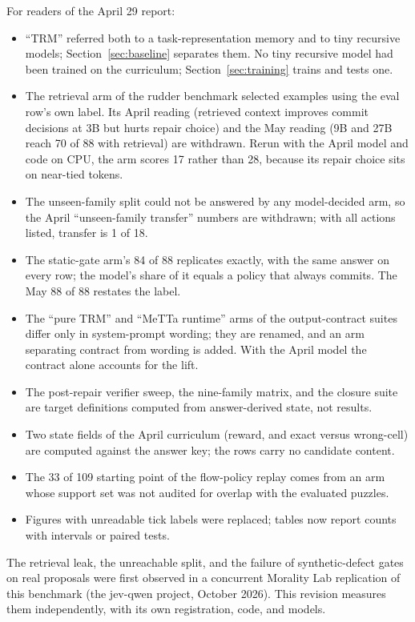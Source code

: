 \documentclass[11pt]{article}
\begin{document}
For readers of the April 29 report:
\begin{itemize}[leftmargin=*]
  \item ``TRM'' referred both to a task-representation memory and to tiny recursive models; Section~\ref{sec:baseline} separates them. No tiny recursive model had been trained on the curriculum; Section~\ref{sec:training} trains and tests one.
  \item The retrieval arm of the rudder benchmark selected examples using the eval row's own label. Its April reading (retrieved context improves commit decisions at 3B but hurts repair choice) and the May reading (9B and 27B reach 70 of 88 with retrieval) are withdrawn. Rerun with the April model and code on CPU, the arm scores 17 rather than 28, because its repair choice sits on near-tied tokens.
  \item The unseen-family split could not be answered by any model-decided arm, so the April ``unseen-family transfer'' numbers are withdrawn; with all actions listed, transfer is 1 of 18.
  \item The static-gate arm's 84 of 88 replicates exactly, with the same answer on every row; the model's share of it equals a policy that always commits. The May 88 of 88 restates the label.
  \item The ``pure TRM'' and ``MeTTa runtime'' arms of the output-contract suites differ only in system-prompt wording; they are renamed, and an arm separating contract from wording is added. With the April model the contract alone accounts for the lift.
  \item The post-repair verifier sweep, the nine-family matrix, and the closure suite are target definitions computed from answer-derived state, not results.
  \item Two state fields of the April curriculum (reward, and exact versus wrong-cell) are computed against the answer key; the rows carry no candidate content.
  \item The 33 of 109 starting point of the flow-policy replay comes from an arm whose support set was not audited for overlap with the evaluated puzzles.
  \item Figures with unreadable tick labels were replaced; tables now report counts with intervals or paired tests.
\end{itemize}
The retrieval leak, the unreachable split, and the failure of synthetic-defect gates on real proposals were first observed in a concurrent Morality Lab replication of this benchmark (the jev-qwen project, October 2026). This revision measures them independently, with its own registration, code, and models.
\end{document}
